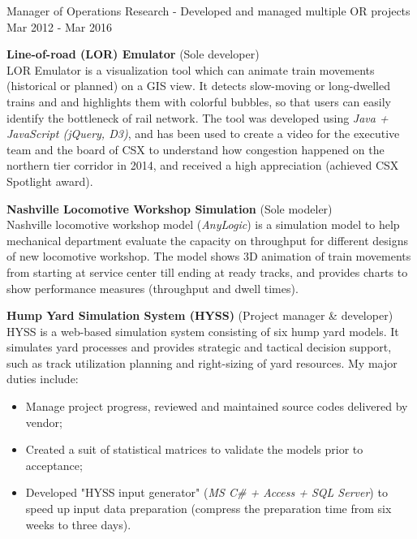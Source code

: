 \begin{cventries}
\cventry
{Manager of Operations Research - Developed and managed multiple OR projects}         %
{}                                       %
{}                                       %
{Mar 2012 - Mar 2016}                    %
{                                        %
    \begin{cvitems}  
        \item {
\textbf{Line-of-road (LOR) Emulator} 
{(Sole developer)}  \\
LOR Emulator is a visualization tool which can animate train movements (historical or planned) on a GIS view. It detects slow-moving or long-dwelled trains and and highlights them with colorful bubbles, so that users can easily identify the bottleneck of rail network. The tool was developed using \textit{Java + JavaScript (jQuery, D3)}, and has been used to create a video for the executive team and the board of CSX to understand how congestion happened on the northern tier corridor in 2014, and received a high appreciation (achieved CSX Spotlight award).
		}
        \item {
\textbf{Nashville Locomotive Workshop Simulation}
{(Sole modeler) } \\
Nashville locomotive workshop model (\textit{AnyLogic}) is a simulation model to help mechanical department evaluate the capacity on throughput for different designs of new locomotive workshop. The model shows 3D animation of train movements from starting at service center till ending at ready tracks, and provides charts to show performance measures (throughput and dwell times).        
        }
        \item {
\textbf{Hump Yard Simulation System (HYSS)}
{(Project manager \& developer)}  \\
HYSS is a web-based simulation system consisting of six hump yard models. It simulates yard processes and provides strategic and tactical decision support, such as track utilization planning and right-sizing of yard resources. My major duties include:      
        }
        \begin{itemize}
            \item  Manage project progress, reviewed and maintained source codes delivered by vendor;
            \item  Created a suit of statistical matrices to validate the models prior to acceptance;
            \item  Developed "HYSS input generator" (\textit{MS C\# + Access + SQL Server}) to speed up input data preparation (compress the preparation time from six weeks to three days).
        \end{itemize}          
    \end{cvitems}
}


\end{cventries}
